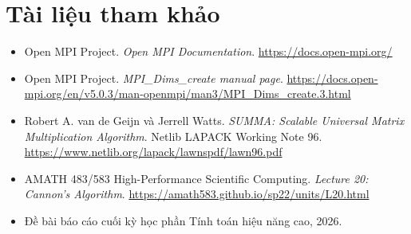 \documentclass[12pt,a4paper]{article}
\begin{document}
\section{Tài liệu tham khảo}
\begin{itemize}
  \item Open MPI Project. \textit{Open MPI Documentation}. \url{https://docs.open-mpi.org/}
  \item Open MPI Project. \textit{MPI\_Dims\_create manual page}. \url{https://docs.open-mpi.org/en/v5.0.3/man-openmpi/man3/MPI_Dims_create.3.html}
  \item Robert A. van de Geijn và Jerrell Watts. \textit{SUMMA: Scalable Universal Matrix Multiplication Algorithm}. Netlib LAPACK Working Note 96. \url{https://www.netlib.org/lapack/lawnspdf/lawn96.pdf}
  \item AMATH 483/583 High-Performance Scientific Computing. \textit{Lecture 20: Cannon's Algorithm}. \url{https://amath583.github.io/sp22/units/L20.html}
  \item Đề bài báo cáo cuối kỳ học phần Tính toán hiệu năng cao, 2026.
\end{itemize}
\end{document}
